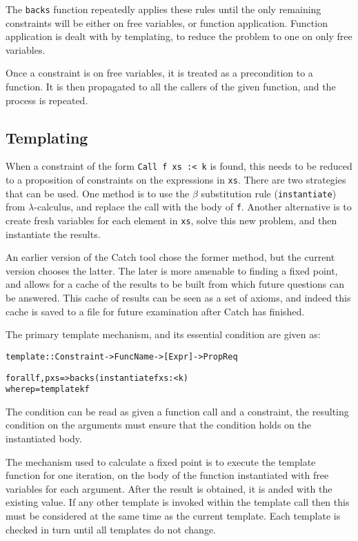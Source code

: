 \documentclass[preprint]{sigplanconf}
\newcommand{\T}[1]{\texttt{#1}}
\newenvironment{code}{\begin{alltt}\small}{\end{alltt}}
\begin{document}
The \T{backs} function repeatedly applies these rules until the only remaining constraints will be either on free variables, or function application. Function application is dealt with by templating, to reduce the problem to one on only free variables.

Once a constraint is on free variables, it is treated as a precondition to a function. It is then propagated to all the callers of the given function, and the process is repeated.

\subsection{Templating}
\label{sec:template}

When a constraint of the form \T{Call f xs :< k} is found, this needs to be reduced to a proposition of constraints on the expressions in \T{xs}. There are two strategies that can be used. One method is to use the $\beta$ substitution rule (\T{instantiate}) from $\lambda$-calculus, and replace the call with the body of \T{f}. Another alternative is to create fresh variables for each element in \T{xs}, solve this new problem, and then instantiate the results.

An earlier version of the Catch tool chose the former method, but the current version chooses the latter. The later is more amenable to finding a fixed point, and allows for a cache of the results to be built from which future questions can be answered. This cache of results can be seen as a set of axioms, and indeed this cache is saved to a file for future examination after Catch has finished.

The primary template mechanism, and its essential condition are given as:

\begin{code}
template :: Constraint -> FuncName -> [Expr] -> Prop Req

forall f, p xs => backs (instantiate f xs :< k)
    where p = template k f
\end{code}

The condition can be read as given a function call and a constraint, the resulting condition on the arguments must ensure that the condition holds on the instantiated body.

The mechanism used to calculate a fixed point is to execute the template function for one iteration, on the body of the function instantiated with free variables for each argument. After the result is obtained, it is anded with the existing value. If any other template is invoked within the template call then this must be considered at the same time as the current template. Each template is checked in turn until all templates do not change.
\end{document}

